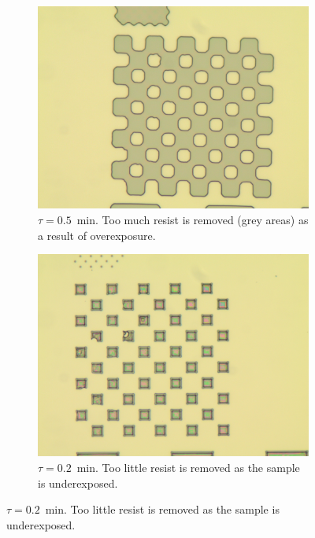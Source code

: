 \begin{figure}[!b]
    \centering
    \begin{subfigure}[t]{0.3\linewidth}
        \centering
        \includegraphics[width=\textwidth]{data/b2d1.jpg}
	    \caption{$\tau = 0.5$~min. Too much resist is removed (grey areas) as a result of overexposure.}
	    \label{fig:b2d1}
    \end{subfigure}
    \hfill
    \begin{subfigure}[t]{0.3\linewidth}
        \centering
        \includegraphics[width=\textwidth]{data/b2h1.jpg}
	    \caption{$\tau = 0.2$~min. Too little resist is removed as the sample is underexposed.}
	    \label{fig:b2h1}
    \end{subfigure}

\end{figure}
